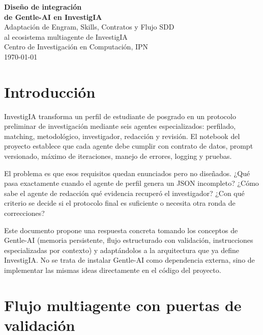\documentclass[12pt, a4paper]{article}
\begin{document}
\begin{center}
    {\LARGE\bfseries Diseño de integración}\\[0.3em]
    {\LARGE\bfseries de Gentle-AI en InvestigIA}\\[1.5em]
    {\normalsize
    Adaptación de Engram, Skills, Contratos y Flujo SDD}\\
    {\normalsize al ecosistema multiagente de InvestigIA}\\[1em]
    Centro de Investigación en Computación, IPN\\[0.5em]
    {\normalsize \today}
\end{center}

\vspace{2em}

\section{Introducción}

InvestigIA transforma un perfil de estudiante de posgrado en un protocolo
preliminar de investigación mediante seis agentes especializados: perfilado,
matching, metodológico, investigador, redacción y revisión. El notebook del
proyecto establece que cada agente debe cumplir con contrato de datos, prompt
versionado, máximo de iteraciones, manejo de errores, logging y pruebas.

El problema es que esos requisitos quedan enunciados pero no diseñados. ¿Qué
pasa exactamente cuando el agente de perfil genera un JSON incompleto? ¿Cómo
sabe el agente de redacción qué evidencia recuperó el investigador? ¿Con qué
criterio se decide si el protocolo final es suficiente o necesita otra ronda
de correcciones?

Este documento propone una respuesta concreta tomando los conceptos de
Gentle-AI (memoria persistente, flujo estructurado con validación, instrucciones
especializadas por contexto) y adaptándolos a la arquitectura que ya define
InvestigIA. No se trata de instalar Gentle-AI como dependencia externa, sino
de implementar las mismas ideas directamente en el código del proyecto.

\section{Flujo multiagente con puertas de validación}
\end{document}
